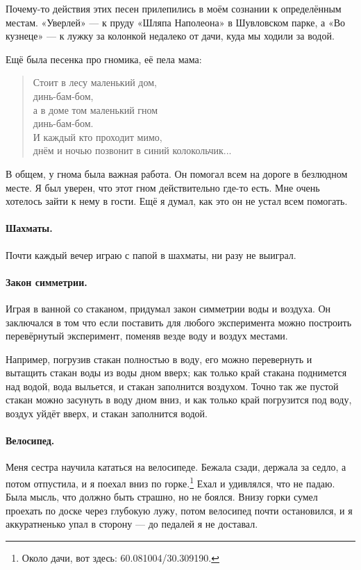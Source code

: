 \documentclass{book}
\begin{document}
Почему-то действия этих песен прилепились в моём сознании к определённым местам.
«Уверлей» --- к пруду «Шляпа Наполеона» в Шувловском парке, 
а «Во кузнеце» --- к лужку за колонкой недалеко от дачи, куда мы ходили за водой.

Ещё была песенка про гномика, её пела мама:
\begin{verse}
Стоит в лесу маленький дом, \\
\quad динь-бам-бом,\\
а в доме том маленький гном \\
\quad динь-бам-бом.\\
И каждый кто проходит мимо,\\
\quad днём и ночью позвонит в синий колокольчик...
\end{verse}
В общем, у гнома была важная работа. 
Он помогал всем на дороге в безлюдном месте.
Я был уверен, что этот гном действительно где-то есть.
Мне очень хотелось зайти к нему в гости.
Ещё я думал, как это он не устал всем помогать.

\paragraph{Шахматы.}
Почти каждый вечер играю с папой в шахматы, ни разу не выиграл.

\paragraph{Закон симметрии.}
Играя в ванной со стаканом, придумал закон симметрии воды и воздуха.
Он заключался в том что если поставить для любого эксперимента можно построить перевёрнутый эксперимент, поменяв везде воду и воздух местами.

Например, погрузив стакан полностью в воду, его можно перевернуть и вытащить стакан воды из воды дном вверх; как только край стакана поднимется над водой, вода выльется, и стакан заполнится воздухом.
Точно так же пустой стакан можно засунуть в воду дном вниз, и как только край погрузится под воду, воздух уйдёт вверх, и стакан заполнится водой.

\paragraph{Велосипед.}
Меня сестра научила кататься на велосипеде.
Бежала сзади, держала за седло, а потом отпустила, и я поехал вниз по горке.\footnote{Около дачи, вот здесь: 60.081004/30.309190.}
Ехал и удивлялся, что не падаю.
Была мысль, что должно быть страшно, но не боялся.
Внизу горки сумел проехать по доске через глубокую лужу,
потом велосипед почти остановился, и я аккуратненько упал в сторону --- до педалей я не доставал.
\end{document}

